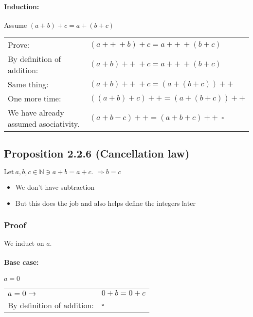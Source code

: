 \documentclass[letterpaper]{article}
\begin{document}
\paragraph{Induction:} Assume $(a + b) + c = a + (b + c)$

\begin{center}
	\begin{tabular}{l l}
		Prove:                             & $(a++~ + b) + c = a++~ + (b + c)$         \\
		By definition of addition:         & $(a + b)++~ + c = a++~ + (b + c)$         \\
		Same thing:                        & $(a + b)++~ + c = (a + (b + c))++$        \\
		One more time:                     & $((a + b) + c)++ = (a + (b + c))++$       \\
		We have already assumed asociativity. & $(a + b + c)++ = (a + b + c)++ ~~\square$
	\end{tabular}
\end{center}


\subsection*{Proposition 2.2.6 (Cancellation law)}
$\text{Let}~ a,b,c \in \mathbb{N} \ni a+b=a+c \text{. } \Rightarrow b=c$

\begin{itemize}
	\item We don't have subtraction
	\item But this does the job and also helps define the integers later
\end{itemize}

\subsubsection*{Proof}
We induct on $a$.

\paragraph{Base case: } $a = 0$
\begin{center}
	\begin{tabular}{l l}
		$a = 0 \to$                & $0 + b = 0 + c$ \\
		By definition of addition: & $\square$       \\
	\end{tabular}
\end{center}
\end{document}
